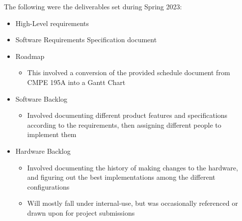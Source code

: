 The following were the deliverables set during Spring 2023:
\begin{itemize}
    \item High-Level requirements
    \item Software Requirements Specification document
    \item Roadmap
          \begin{itemize}
              \item This involved a conversion of the provided schedule document from CMPE 195A into a Gantt Chart
          \end{itemize}
    \item Software Backlog
          \begin{itemize}
              \item Involved documenting different product features and specifications according to the requirements, then assigning different people to implement them
          \end{itemize}
    \item Hardware Backlog
          \begin{itemize}
              \item Involved documenting the history of making changes to the hardware, and figuring out the best implementations among the different configurations
              \item Will mostly fall under internal-use, but was occasionally referenced or drawn upon for project submissions
          \end{itemize}
\end{itemize}

